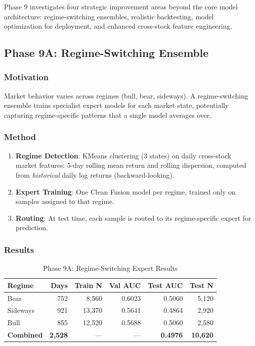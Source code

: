 \documentclass[12pt,a4paper]{article}
\begin{document}
Phase 9 investigates four strategic improvement areas beyond the core model architecture:
regime-switching ensembles, realistic backtesting, model optimization for deployment,
and enhanced cross-stock feature engineering.

\subsection{Phase 9A: Regime-Switching Ensemble}

\subsubsection{Motivation}
Market behavior varies across regimes (bull, bear, sideways). A regime-switching
ensemble trains specialist expert models for each market state, potentially capturing
regime-specific patterns that a single model averages over.

\subsubsection{Method}
\begin{enumerate}
    \item \textbf{Regime Detection}: KMeans clustering (3 states) on daily cross-stock 
    market features: 5-day rolling mean return and rolling dispersion, computed from 
    \textit{historical} daily log returns (backward-looking).
    \item \textbf{Expert Training}: One Clean Fusion model per regime, trained only on 
    samples assigned to that regime.
    \item \textbf{Routing}: At test time, each sample is routed to its regime-specific 
    expert for prediction.
\end{enumerate}

\subsubsection{Results}

\begin{table}[H]
\centering
\caption{Phase 9A: Regime-Switching Expert Results}
\begin{tabular}{lrrrrr}
\toprule
\textbf{Regime} & \textbf{Days} & \textbf{Train N} & \textbf{Val AUC} & \textbf{Test AUC} & \textbf{Test N} \\
\midrule
Bear     & 752 & 8,560  & 0.6023 & 0.5060 & 5,120 \\
Sideways & 921 & 13,370 & 0.5641 & 0.4864 & 2,920 \\
Bull     & 855 & 12,520 & 0.5688 & 0.5060 & 2,580 \\
\midrule
\textbf{Combined} & \textbf{2,528} & --- & --- & \textbf{0.4976} & \textbf{10,620} \\
\bottomrule
\end{tabular}
\end{table}
\end{document}
